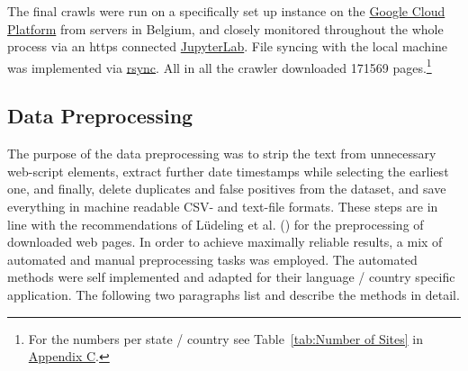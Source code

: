 The final crawls were run on a specifically set up instance on the \href{https://cloud.google.com/}{Google Cloud Platform} from servers in Belgium, and closely monitored throughout the whole process via an https connected \href{https://jupyterlab.readthedocs.io/en/stable/}{JupyterLab}. File syncing with the local machine was implemented via \href{https://linux.die.net/man/1/rsync}{rsync}. All in all the crawler downloaded 171569 pages.\footnote{For the numbers per state / country see Table~\ref{tab:Number of Sites} in \href{Appendix C}{Appendix C}.}


\subsection{Data Preprocessing}
The purpose of the data  preprocessing was to strip the text from unnecessary web-script elements, extract further date timestamps while selecting the earliest one, and finally, delete duplicates and false positives from the dataset, and save everything in machine readable CSV- and text-file formats. These steps are in line with the recommendations of Lüdeling et al. (\cite*[p. 19]{Ludeling2015}) for the preprocessing of downloaded web pages. In order to achieve maximally reliable results, a mix of automated and manual preprocessing tasks was employed. The automated methods were self implemented and adapted for their language / country specific application. The following two paragraphs list and describe the methods in detail.\par
